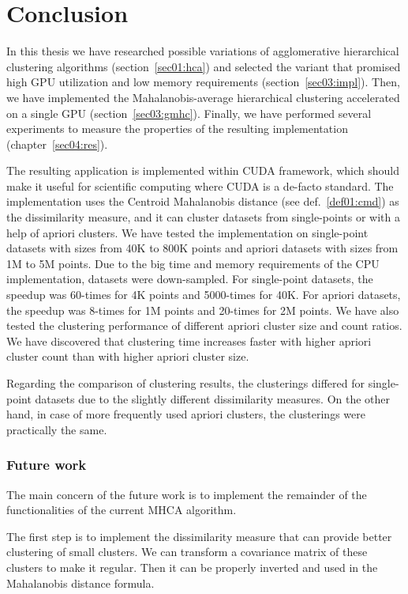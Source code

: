 \chapter*{Conclusion}

In this thesis we have researched possible variations of agglomerative hierarchical clustering algorithms (section~\ref{sec01:hca}) and selected the variant that promised high GPU utilization and low memory requirements (section~\ref{sec03:impl}). Then, we have implemented the Mahalanobis-average hierarchical clustering accelerated on a single GPU (section~\ref{sec03:gmhc}). Finally, we have performed several experiments to measure the properties of the resulting implementation (chapter~\ref{sec04:res}). 

The resulting application is implemented within CUDA framework, which should make it useful for scientific computing where CUDA is a de-facto standard. The implementation uses the Centroid Mahalanobis distance (see def.~\ref{def01:cmd}) as the dissimilarity measure, and it can cluster datasets from single-points or with a help of apriori clusters. We have tested the implementation on single-point datasets with sizes from 40K to 800K points and apriori datasets with sizes from 1M to 5M points. Due to the big time and memory requirements of the CPU implementation, datasets were down-sampled. For single-point datasets, the speedup was 60-times for 4K points and 5000-times for 40K. For apriori datasets, the speedup was 8-times for 1M points and 20-times for 2M points. We have also tested the clustering performance of different apriori cluster size and count ratios. We have discovered that clustering time increases faster with higher apriori cluster count than with higher apriori cluster size.

Regarding the comparison of clustering results, the clusterings differed for sin\-gle-point datasets due to the slightly different dissimilarity measures. On the other hand, in case of more frequently used apriori clusters, the clusterings were practically the same.

\subsection*{Future work}

The main concern of the future work is to implement the remainder of the functionalities of the current MHCA algorithm.

The first step is to implement the dissimilarity measure that can provide better clustering of small clusters. We can transform a covariance matrix of  these clusters to make it regular. Then it can be properly inverted and used in the Mahalanobis distance formula.

